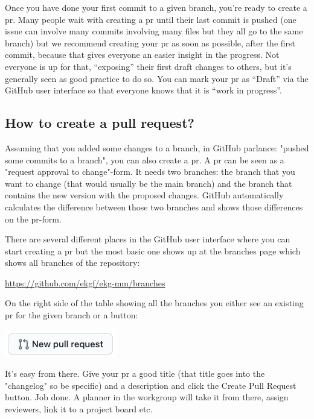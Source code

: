 Once you have done your first commit to a given branch, you’re ready to
create a \gls{pr}. 
Many people wait with creating a \gls{pr} until their last commit is pushed
(one issue can involve many commits involving many files but they all 
go to the same branch) but we recommend creating your \gls{pr} as soon as possible, 
after the first commit, because that gives everyone an easier insight 
in the progress. Not everyone is up for that, “exposing” their 
first draft changes to others, but it’s generally seen as 
good practice to do so. 
You can mark your \gls{pr} as “Draft” via the GitHub user interface so that 
everyone knows that it is “work in progress”.

\subsection{How to create a pull request?}
\label{subsec:ekg-mm-process-how-to-create-a-pull-request}

Assuming that you added some changes to a branch, in GitHub parlance: 
"pushed some commits to a branch", you can also create a \gls{pr}. 
A \gls{pr} can be seen as a "request approval to change"-form. 
It needs two branches: the branch that you want to change (that would 
usually be the main branch) and the branch that contains the new version 
with the proposed changes. 
GitHub automatically calculates the difference between those two branches
and shows those differences on the \gls{pr}-form.

There are several different places in the GitHub user interface where you 
can start creating a \gls{pr} but the most basic one shows up at the branches 
page which shows all branches of the repository:

\begin{center}
    \url{https://github.com/ekgf/ekg-mm/branches}
\end{center}

On the right side of the table showing all the branches you either see an 
existing \gls{pr} for the given branch or a button:

\begin{center}
    \includegraphics[scale=0.5]{../images/ekgmm-process-pr-button.png}
\end{center}

It’s easy from there. 
Give your \gls{pr} a good title (that title goes into the "changelog" so be 
specific) and a description and click the Create Pull Request button. 
Job done. A planner in the workgroup will take it from there, 
assign reviewers, link it to a project board etc.

